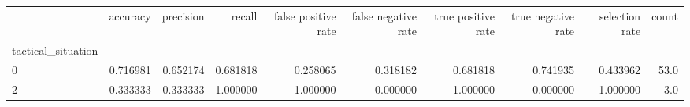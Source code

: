 \begin{tabular}{lrrrrrrrrr}
\toprule
{} &  accuracy &  precision &    recall &  false positive rate &  false negative rate &  true positive rate &  true negative rate &  selection rate &  count \\
tactical\_situation &           &            &           &                      &                      &                     &                     &                 &        \\
\midrule
0                  &  0.716981 &   0.652174 &  0.681818 &             0.258065 &             0.318182 &            0.681818 &            0.741935 &        0.433962 &   53.0 \\
2                  &  0.333333 &   0.333333 &  1.000000 &             1.000000 &             0.000000 &            1.000000 &            0.000000 &        1.000000 &    3.0 \\
\bottomrule
\end{tabular}
